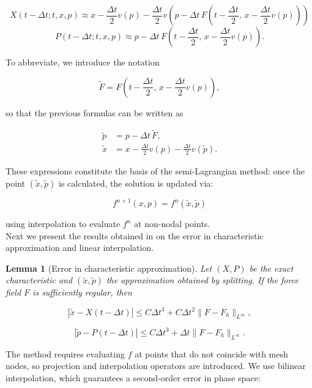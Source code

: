 \documentclass[11pt,a4paper,twoside,pdf]{article}
\numberwithin{equation}{section}
\newtheorem{lemma}[theorem]{Lemma}
\begin{document}
\[
X(t-\Delta t;t,x,p) \approx x
- \frac{\Delta t}{2}v(p)
- \frac{\Delta t}{2}v\!\left(p - \Delta t\,F\!\left(t-\frac{\Delta t}{2},\, x - \frac{\Delta t}{2}v(p)\right)\right)
\]
\[
P(t-\Delta t;t,x,p) \approx p
- \Delta t\,F\!\left(t-\frac{\Delta t}{2},\, x - \frac{\Delta t}{2}v(p)\right).
\]



To abbreviate, we introduce the notation


\[
\tilde{F} = F\!\left(t-\frac{\Delta t}{2},\, x - \frac{\Delta t}{2}v(p)\right),
\]

so that the previous formulas can be written as


\[
\begin{aligned}
\tilde{p} &= p - \Delta t\,\tilde{F}, \\[0.3em]
\tilde{x} &= x - \frac{\Delta t}{2}v(p) - \frac{\Delta t}{2}v(\tilde{p}).
\end{aligned}
\]



These expressions constitute the basis of the semi-Lagrangian method: once the point $(\tilde{x},\tilde{p})$ is calculated, the solution is updated via:


\[
f^{n+1}(x,p) = f^{n}(\tilde{x},\tilde{p})
\]


using interpolation to evaluate $f^n$ at non-nodal points.\\


Next we present the results obtained in \cite{bostan2009convergence} on the error in characteristic approximation and linear interpolation.

\begin{lemma}[Error in characteristic approximation]
Let $(X,P)$ be the exact characteristic and $(\tilde{x},\tilde{p})$ the approximation obtained by splitting. If the force field $F$ is sufficiently regular, then


\[
|\tilde{x}-X(t-\Delta t)| \le C\Delta t^3 + C\Delta t^2\|F-F_h\|_{L^\infty},
\]




\[
|\tilde{p}-P(t-\Delta t)| \le C\Delta t^3 + \Delta t\|F-F_h\|_{L^\infty}.
\]


\end{lemma}






The method requires evaluating $f$ at points that do not coincide with mesh nodes, so projection and interpolation operators are introduced. We use bilinear interpolation, which guarantees a second-order error in phase space:
\end{document}
